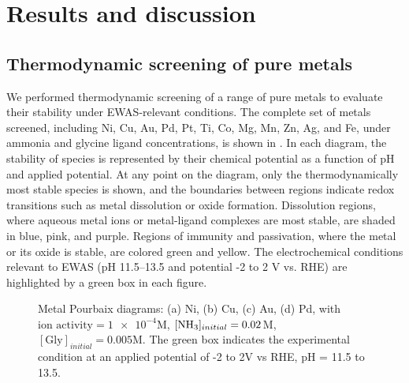 \documentclass[journal=jacsat,manuscript=article]{achemso}
\begin{document}
\section{Results and discussion}

\subsection{Thermodynamic screening of pure metals}
We performed thermodynamic screening of a range of pure metals to evaluate their stability under EWAS-relevant conditions. The complete set of metals screened, including Ni, Cu, Au, Pd, Pt, Ti, Co, Mg, Mn, Zn, Ag, and Fe, under ammonia and glycine ligand concentrations, is shown in . In each diagram, the stability of species is represented by their chemical potential as a function of pH and applied potential. At any point on the diagram, only the thermodynamically most stable species is shown, and the boundaries between regions indicate redox transitions such as metal dissolution or oxide formation. Dissolution regions, where aqueous metal ions or metal-ligand complexes are most stable, are shaded in blue, pink, and purple. Regions of immunity and passivation, where the metal or its oxide is stable, are colored green and yellow. The electrochemical conditions relevant to EWAS (pH 11.5–13.5 and potential -2 to 2 V vs. RHE) are highlighted by a green box in each figure.
\begin{figure}[htbp]
\centering
{}
\caption{Metal Pourbaix diagrams: (a) Ni, (b) Cu, (c) Au, (d) Pd, with $\text{ion activity}=\num{1e-4}$M, $[\ce{NH3}]_{initial}= 0.02$M, $[\text{Gly}]_{initial}=0.005$M. The green box indicates the experimental condition at an applied potential of -2 to 2V vs RHE, pH = 11.5 to 13.5.}
\label{fig:metal_pourbaix_collage_1}
\end{figure}
\end{document}
